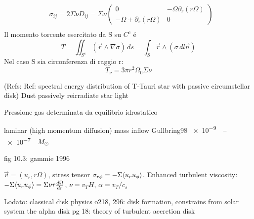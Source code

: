 \begin{workout}

\end{workout}

\begin{workout}
\begin{align}
&\sigma_{ij}=2\Sigma\nu D_{ij}=\Sigma\nu\begin{pmatrix}0&-\Omega\partial_r(r\Omega)\\-\Omega+\partial_r(r\Omega)&0
\end{pmatrix}\\
\end{align}
Il momento torcente esercitato da S su $C^c$ \'e
\begin{equation}
T=\iint_{S^c}(\vec{r}\wedge\nabla\sigma)\,ds=\int_S\vec{r}\wedge(\sigma\,dl\vec{n})
\end{equation}
Nel caso S sia circonferenza di raggio r:
\begin{equation}
T_{\nu}=3\pi r^2\Omega_0\Sigma\nu
\end{equation}
\end{workout}

\begin{workout}
(Refs: Ref: spectral energy distribution of T-Tauri star with passive circumstellar disk)
Dust passively reirradiate star light
\end{workout}

\begin{workout}
Pressione gas determinata da equilibrio idrostatico
\end{workout}

\begin{workout}
laminar (high momentum diffusion)
mass inflow Gullbring98 \SIrange{e-9}{e-7}{\per\year}$M_{\odot}{}$
\end{workout}
\begin{workout}[MRI]
fig 10.3:
gammie 1996
\end{workout}

\begin{workout}
$\vec{v}=(u_r,r\Omega)$, stress tensor $\sigma_{r\phi}=-\Sigma\langle u_ru_{\phi} \rangle$.
Enhanced turbulent viscosity: $-\Sigma\langle u_ru_{\phi} \rangle=\Sigma\nu r\frac{d \Omega}{d r}$, $\nu=v_TH$, $\alpha=v_T/c_s$
\end{workout}

\begin{workout}
Lodato: classical disk physics
o218, 296: disk formation, constrains from solar system
the alpha disk pg 18: theory of turbulent accretion disk
\end{workout}

